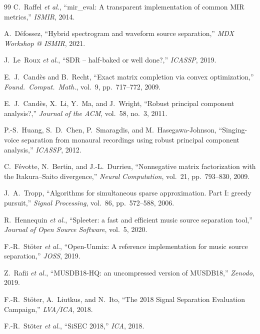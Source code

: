\documentclass[11pt]{article}
\begin{document}
{\small
\begin{thebibliography}{99}
 C.\ Raffel \emph{et al.},
``mir\_eval: A transparent implementation of common MIR metrics,''
\textit{ISMIR}, 2014.

 A.\ D\'efossez,
``Hybrid spectrogram and waveform source separation,''
\textit{MDX Workshop @ ISMIR}, 2021.

 J.\ Le~Roux \emph{et al.},
``SDR -- half-baked or well done?,''
\textit{ICASSP}, 2019.

 E.\ J.\ Cand\`es and B.\ Recht,
``Exact matrix completion via convex optimization,''
\textit{Found.\ Comput.\ Math.}, vol.~9, pp.~717--772, 2009.

 E.\ J.\ Cand\`es, X.\ Li, Y.\ Ma, and J.\ Wright,
``Robust principal component analysis?,''
\textit{Journal of the ACM}, vol.~58, no.~3, 2011.

 P.-S.\ Huang, S.\ D.\ Chen, P.\ Smaragdis, and M.\ Hasegawa-Johnson,
``Singing-voice separation from monaural recordings using robust principal
component analysis,'' \textit{ICASSP}, 2012.

 C.\ F\'evotte, N.\ Bertin, and J.-L.\ Durrieu,
``Nonnegative matrix factorization with the Itakura--Saito divergence,''
\textit{Neural Computation}, vol.~21, pp.~793--830, 2009.

 J.\ A.\ Tropp,
``Algorithms for simultaneous sparse approximation. Part I: greedy pursuit,''
\textit{Signal Processing}, vol.~86, pp.~572--588, 2006.

 R.\ Hennequin \emph{et al.},
``Spleeter: a fast and efficient music source separation tool,''
\textit{Journal of Open Source Software}, vol.~5, 2020.

 F.-R.\ St\"oter \emph{et al.},
``Open-Unmix: A reference implementation for music source separation,''
\textit{JOSS}, 2019.

 Z.\ Rafii \emph{et al.},
``MUSDB18-HQ: an uncompressed version of MUSDB18,''
\textit{Zenodo}, 2019.

 F.-R.\ St\"oter, A.\ Liutkus, and N.\ Ito,
``The 2018 Signal Separation Evaluation Campaign,''
\textit{LVA/ICA}, 2018.

 F.-R.\ St\"oter \emph{et al.},
``SiSEC 2018,'' \textit{ICA}, 2018.


\end{thebibliography}}
\end{document}
